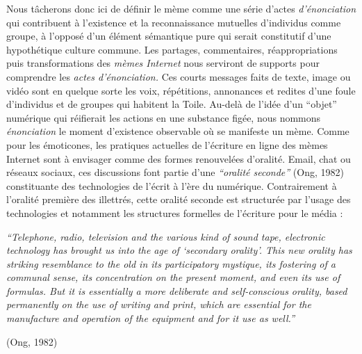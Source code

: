 Nous t\^acherons donc ici de d\'efinir le m\`eme comme une s\'erie
d{\textquoteright}actes \textit{d{\textquoteright}\'enonciation }qui
contribuent \`a l{\textquoteright}existence et la reconnaissance
mutuelles d{\textquoteright}individus comme groupe, \`a
l{\textquoteright}oppos\'e d{\textquoteright}un \'el\'ement
s\'emantique pure qui serait constitutif d{\textquoteright}une
hypoth\'etique culture commune. Les partages, commentaires,
r\'eappropriations puis transformations des \textit{m\`emes Internet
}nous serviront de supports pour comprendre les \textit{actes
d{\textquoteright}\'enonciation. }Ces courts messages faits de texte,
image ou vid\'eo sont en quelque sorte les voix, r\'ep\'etitions,
annonances et redites d{\textquoteright}une foule
d{\textquoteright}individus et de groupes qui habitent la Toile.
Au-del\`a de l{\textquoteright}id\'ee d{\textquoteright}un
{\textquotedblleft}objet{\textquotedblright} num\'erique qui
r\'eifierait les actions en une substance fig\'ee, nous nommons
\textit{\'enonciation} le moment d{\textquoteright}existence observable
o\`u se manifeste un m\`eme. Comme pour les \'emoticones, les pratiques
actuelles de l{\textquoteright}\'ecriture en ligne des m\`emes Internet
sont \`a envisager comme des formes renouvel\'ees
d{\textquoteright}oralit\'e. Email, chat ou r\'eseaux sociaux, ces
discussions font partie d{\textquoteright}une
\textit{{\textquotedblleft}oralit\'e seconde{\textquotedblright} }(Ong,
1982) constituante des technologies de l{\textquoteright}\'ecrit \`a
l{\textquoteright}\`ere du num\'erique. Contrairement \`a
l{\textquoteright}oralit\'e premi\`ere des illettr\'es, cette oralit\'e
seconde est structur\'ee par l{\textquoteright}usage des technologies
et notamment les structures formelles de l{\textquoteright}\'ecriture
pour le m\'edia : 

\textit{{\textquotedblleft}Telephone, radio, television and the various
kind of sound tape, electronic technology has brought us into the age
of {\textquoteleft}secondary orality{\textquoteright}. This new orality
has striking resemblance to the old in its participatory mystique, its
fostering of a communal sense, its concentration on the present moment,
and even its use of formulas. But it is essentially a more deliberate
and self-conscious orality, based permanently on the use of writing and
print, which are essential for the manufacture and operation of the
equipment and for it use as well.{\textquotedblright}}

{\raggedleft{}\color{black}
(Ong, 1982)
\par}

